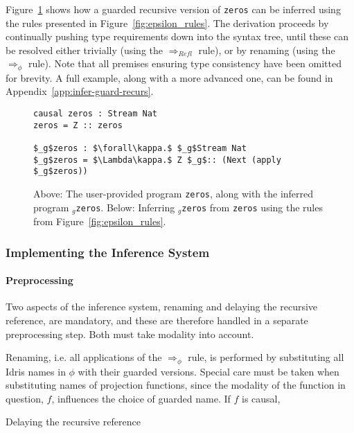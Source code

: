 Figure~\ref{fig:epsilon_zeros} shows how a guarded recursive version of
\texttt{zeros} can be inferred using the rules presented in Figure~\ref{fig:epsilon_rules}. The
derivation proceeds by continually pushing type requirements down into the
syntax tree, until these can be resolved either trivially (using the
$\Longrightarrow_{Refl}$ rule), or by renaming (using the
$\Longrightarrow_{\phi}$ rule). Note that all premises ensuring type consistency
have been omitted for brevity. A full example, along with a more advanced one,
can be found in Appendix~\ref{app:infer-guard-recurs}.
\begin{figure}
\begin{lstlisting}[mathescape]
causal zeros : Stream Nat
zeros = Z :: zeros

$_g$zeros : $\forall\kappa.$ $_g$Stream Nat
$_g$zeros = $\Lambda\kappa.$ Z $_g$:: (Next (apply $_g$zeros))
\end{lstlisting}

  \caption{Above: The user-provided program \texttt{zeros}, along with the
    inferred program $_g$\texttt{zeros}. Below: Inferring $_g$\texttt{zeros} from \texttt{zeros} using the rules from
  Figure~\ref{fig:epsilon_rules}.}
  \label{fig:epsilon_zeros}
\end{figure}

\subsubsection{Implementing the Inference System}

\paragraph{Preprocessing} Two aspects of the inference system, renaming and
delaying the recursive reference, are mandatory, and these 
are therefore handled in a separate preprocessing step. Both must take modality
into account.

Renaming, i.e. all applications of the $\Longrightarrow_{\phi}$ rule, is
performed by substituting all Idris names in $\phi$ with their guarded
versions. Special care must be taken when substituting names of projection
functions, since the modality of the function in question, $f$, influences the choice
of guarded name. If $f$ is causal, 

Delaying the recursive reference


